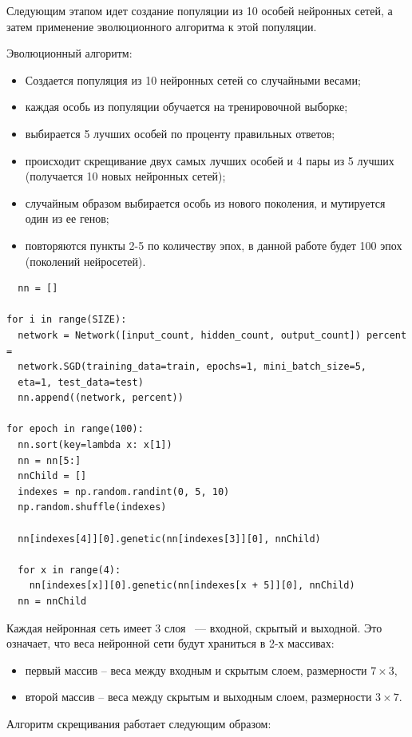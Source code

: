 Следующим этапом идет создание популяции из 10 особей нейронных сетей, а затем применение эволюционного алгоритма к этой популяции.

Эволюционный алгоритм:
\begin{itemize}
  \item Создается популяция из 10 нейронных сетей со случайными весами;
  \item каждая особь из популяции обучается на тренировочной выборке;
  \item выбирается 5 лучших особей по проценту правильных ответов;
  \item происходит скрещивание двух самых лучших особей и 4 пары из 5 лучших (получается 10 новых нейронных сетей);
  \item случайным образом выбирается особь из нового поколения, и мутируется один из ее генов;
  \item повторяются пункты 2-5 по количеству эпох, в данной работе будет 100 эпох (поколений нейросетей).
\end{itemize}

\begin{lstlisting}
  nn = []

for i in range(SIZE):
  network = Network([input_count, hidden_count, output_count]) percent =
  network.SGD(training_data=train, epochs=1, mini_batch_size=5,
  eta=1, test_data=test)
  nn.append((network, percent))

for epoch in range(100):
  nn.sort(key=lambda x: x[1])
  nn = nn[5:] 
  nnChild = []
  indexes = np.random.randint(0, 5, 10)
  np.random.shuffle(indexes) 
 
  nn[indexes[4]][0].genetic(nn[indexes[3]][0], nnChild) 

  for x in range(4):
    nn[indexes[x]][0].genetic(nn[indexes[x + 5]][0], nnChild)
  nn = nnChild
\end{lstlisting}

Каждая нейронная сеть имеет 3 слоя ~--- входной, скрытый и выходной. Это означает, что веса нейронной сети будут храниться в 2-х массивах:

\begin{itemize}
  \item первый массив – веса между входным и скрытым слоем, размерности $7\times3$,
  \item второй массив – веса между скрытым и выходным слоем, размерности $3\times7$.
\end{itemize}

Алгоритм скрещивания работает следующим образом:

